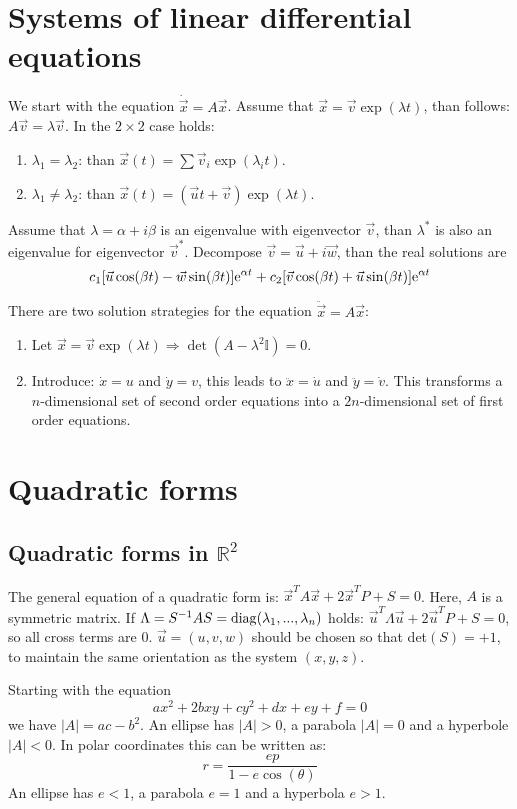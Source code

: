 \section{Systems of linear differential equations}
We start with the equation $\dot{\vec{x}}=A\vec{x}$. Assume that
$\vec{x}=\vec{v}\exp(\lambda t)$, than follows: $A\vec{v}=\lambda\vec{v}$.
In the $2\times2$ case holds:
\begin{enumerate}
	\item $\lambda_1=\lambda_2$: than $\vec{x}(t)=\sum\vec{v}_i\exp(\lambda_it)$.
	\item $\lambda_1\neq\lambda_2$: than $\vec{x}(t)=(\vec{u}t+\vec{v})\exp(\lambda t)$.
\end{enumerate}
Assume that $\lambda=\alpha+i\beta$ is an eigenvalue with eigenvector $\vec{v}$,
than $\lambda^*$ is also an eigenvalue for eigenvector $\vec{v}^*$. Decompose
$\vec{v}=\vec{u}+i\vec{w}$, than the real solutions are
\[
c_1[\vec{u}\cos(\beta t)-\vec{w}\sin(\beta t)]{\rm e}^{\alpha t}+c_2[\vec{v}\cos(\beta t)+\vec{u}\sin(\beta t)]{\rm e}^{\alpha t}
\]
 
There are two solution strategies for the equation $\ddot{\vec{x}}=A\vec{x}$:
\begin{enumerate}
	\item Let $\vec{x}=\vec{v}\exp(\lambda t)\Rightarrow\det(A-\lambda^2 \mathbb{I})=0$.
	\item Introduce: $\dot{x}=u$ and $\dot{y}=v$, this leads to $\ddot{x}=\dot{u}$ and
	$\ddot{y}=\dot{v}$. This transforms a $n$-dimensional set of second order
	equations into a $2n$-dimensional set of first order equations. 
\end{enumerate}

\section{Quadratic forms}
\subsection{Quadratic forms in $ \mathbb{R}^2$}
The general equation of a quadratic form is:
$\vec{x}^TA\vec{x}+2\vec{x}^TP+S=0$. Here, $A$ is a symmetric matrix.
If $\Lambda=S^{-1}AS={\rm diag}(\lambda_1,...,\lambda_n)$ holds:
$\vec{u}^T\Lambda\vec{u}+2\vec{u}^TP+S=0$, so all cross terms are 0.
$\vec{u}=(u,v,w)$ should be chosen so that det$(S)=+1$,
to maintain the same orientation as the system $(x,y,z)$.
 
Starting with the equation
\[
ax^2+2bxy+cy^2+dx+ey+f=0
\]
we have $|A|=ac-b^2$. An ellipse has $|A|>0$, a parabola $|A|=0$ and
a hyperbole $|A|<0$. In polar coordinates this can be written as:
\[
r=\frac{ep}{1-e\cos(\theta)}
\]
An ellipse has $e<1$, a parabola $e=1$ and a hyperbola $e>1$.

